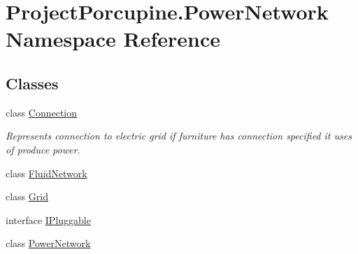 \hypertarget{namespace_project_porcupine_1_1_power_network}{}\section{Project\+Porcupine.\+Power\+Network Namespace Reference}
\label{namespace_project_porcupine_1_1_power_network}
\subsection*{Classes}
\begin{DoxyCompactItemize}
\item 
class \hyperlink{class_project_porcupine_1_1_power_network_1_1_connection}{Connection}
\begin{DoxyCompactList}\small\item\em Represents connection to electric grid if furniture has connection specified it uses of produce power. \end{DoxyCompactList}\item 
class \hyperlink{class_project_porcupine_1_1_power_network_1_1_fluid_network}{Fluid\+Network}
\item 
class \hyperlink{class_project_porcupine_1_1_power_network_1_1_grid}{Grid}
\item 
interface \hyperlink{interface_project_porcupine_1_1_power_network_1_1_i_pluggable}{I\+Pluggable}
\item 
class \hyperlink{class_project_porcupine_1_1_power_network_1_1_power_network}{Power\+Network}
\end{DoxyCompactItemize}
